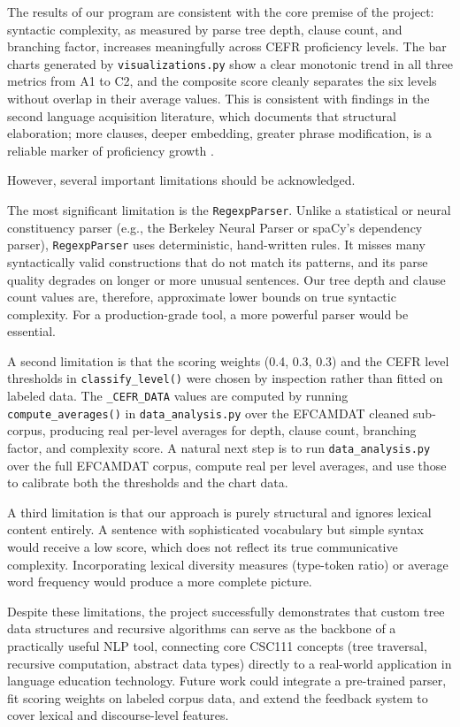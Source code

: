 \documentclass[11pt]{article}
\begin{document}
The results of our program are consistent with the core premise of the project: syntactic complexity, as measured by parse tree depth, clause count, and branching factor, increases meaningfully across CEFR proficiency levels. The bar charts generated by \texttt{visualizations.py} show a clear monotonic trend in all three metrics from A1 to C2, and the composite score cleanly separates the six levels without overlap in their average values. This is consistent with findings in the second language acquisition literature, which documents that structural elaboration; more clauses, deeper embedding, greater phrase modification, is a reliable marker of proficiency growth \cite{zhang2025, carla}.
 
However, several important limitations should be acknowledged.
 
The most significant limitation is the \texttt{RegexpParser}. Unlike a statistical or neural constituency parser (e.g., the Berkeley Neural Parser or spaCy's dependency parser), \texttt{RegexpParser} uses deterministic, hand-written rules. It misses many syntactically valid constructions that do not match its patterns, and its parse quality degrades on longer or more unusual sentences. Our tree depth and clause count values are, therefore, approximate lower bounds on true syntactic complexity. For a production-grade tool, a more powerful parser would be essential.
 
A second limitation is that the scoring weights (0.4, 0.3, 0.3) and the CEFR level thresholds in \texttt{classify\_level()} were chosen by inspection rather than fitted on labeled data. The \texttt{\_CEFR\_DATA} values are computed by running \texttt{compute\_averages()} in \texttt{data\_analysis.py} over the EFCAMDAT cleaned sub-corpus, producing real per-level averages for depth, clause count, branching factor, and complexity score. A natural next step is to run \texttt{data\_analysis.py} over the full EFCAMDAT corpus, compute real per level averages, and use those to calibrate both the thresholds and the chart data.
 
A third limitation is that our approach is purely structural and ignores lexical content entirely. A sentence with sophisticated vocabulary but simple syntax would receive a low score, which does not reflect its true communicative complexity. Incorporating lexical diversity measures (type-token ratio) or average word frequency would produce a more complete picture.
 
Despite these limitations, the project successfully demonstrates that custom tree data structures and recursive algorithms can serve as the backbone of a practically useful NLP tool, connecting core CSC111 concepts (tree traversal, recursive computation, abstract data types) directly to a real-world application in language education technology. Future work could integrate a pre-trained parser, fit scoring weights on labeled corpus data, and extend the feedback system to cover lexical and discourse-level features.
 
\end{document}
